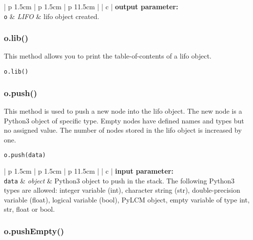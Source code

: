 \vskip 0.8cm

\noindent
\begin{tabular} {| p {1.5cm} | p {1.5cm} | p {11.5cm} |}
\hline
{} {| c |} {\bf output parameter:} \\
\hline
{\tt o} & {\it LIFO} & {\sc lifo} object created. \\
\hline
\end{tabular}

\vskip 0.8cm

\subsubsection{o.lib()}

This method allows you to print the table-of-contents of a {\sc lifo} object.

\begin{verbatim}
o.lib()
\end{verbatim}

\vskip 0.8cm

\subsubsection{o.push()}

This method is used to push a new node into the {\sc lifo} object. The new node is a Python3 object of specific type. Empty nodes have defined names and types but no assigned value.  The number of nodes stored in the {\sc lifo} object is increased by one.

\begin{verbatim}
o.push(data)
\end{verbatim}

\noindent
\begin{tabular} {| p {1.5cm} | p {1.5cm} | p {11.5cm} |}
\hline
{} {| c |} {\bf input parameter:} \\
\hline
{\tt data} & {\it object}  & Python3 object to push in the stack. The following Python3 types are allowed: integer variable (int), character string (str), double-precision variable (float),
logical variable (bool),  PyLCM object, empty variable of type int, str, float or bool.\\
\hline
\end{tabular}

\vskip 0.8cm

\subsubsection{o.pushEmpty()}

